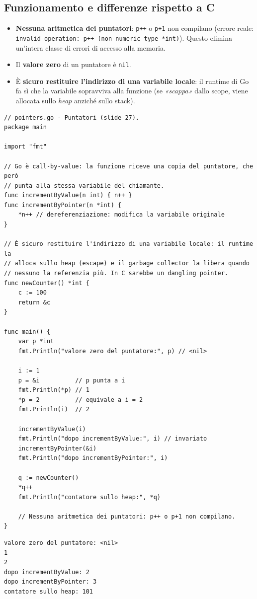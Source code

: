 \documentclass[11pt,a4paper]{report}
\newcommand{\cod}[1]{\texttt{#1}}
\begin{document}
\subsection{Funzionamento e differenze rispetto a C}

\begin{itemize}
  \item \textbf{Nessuna aritmetica dei puntatori}: \cod{p++} o \cod{p+1} non
        compilano (errore reale: \texttt{invalid operation: p++ (non-numeric type *int)}).
        Questo elimina un'intera classe di errori di accesso alla memoria.
  \item Il \textbf{valore zero} di un puntatore è \cod{nil}.
  \item È \textbf{sicuro restituire l'indirizzo di una variabile locale}: il
        runtime di Go fa sì che la variabile sopravviva alla funzione (se
        \emph{«scappa»} dallo scope, viene allocata sullo \emph{heap} anziché
        sullo stack).
\end{itemize}

\begin{lstlisting}[style=gocode,caption={\texttt{04\_data\_structures/pointers.go}}]
// pointers.go - Puntatori (slide 27).
package main

import "fmt"

// Go è call-by-value: la funzione riceve una copia del puntatore, che però
// punta alla stessa variabile del chiamante.
func incrementByValue(n int) { n++ }
func incrementByPointer(n *int) {
	*n++ // dereferenziazione: modifica la variabile originale
}

// È sicuro restituire l'indirizzo di una variabile locale: il runtime la
// alloca sullo heap (escape) e il garbage collector la libera quando
// nessuno la referenzia più. In C sarebbe un dangling pointer.
func newCounter() *int {
	c := 100
	return &c
}

func main() {
	var p *int
	fmt.Println("valore zero del puntatore:", p) // <nil>

	i := 1
	p = &i          // p punta a i
	fmt.Println(*p) // 1
	*p = 2          // equivale a i = 2
	fmt.Println(i)  // 2

	incrementByValue(i)
	fmt.Println("dopo incrementByValue:", i) // invariato
	incrementByPointer(&i)
	fmt.Println("dopo incrementByPointer:", i)

	q := newCounter()
	*q++
	fmt.Println("contatore sullo heap:", *q)

	// Nessuna aritmetica dei puntatori: p++ o p+1 non compilano.
}
\end{lstlisting}
\begin{lstlisting}[style=output]
valore zero del puntatore: <nil>
1
2
dopo incrementByValue: 2
dopo incrementByPointer: 3
contatore sullo heap: 101
\end{lstlisting}
\end{document}
